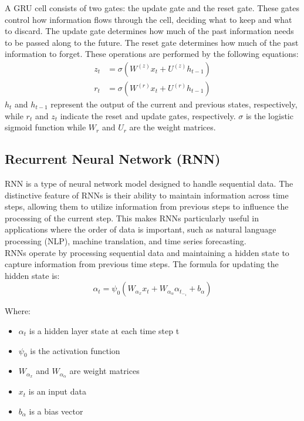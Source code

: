\documentclass{ieeeojies}
\begin{document}
A GRU cell consists of two gates: the update gate and the reset gate. These gates control how information flows through the cell, deciding what to keep and what to discard. The update gate determines how much of the past information needs to be passed along to the future. The reset gate determines how much of the past information to forget. These operations are performed by the following equations:
\begin{align*}
z_t &= \sigma\left( W^{(z)} x_t + U^{(z)} h_{t-1} \right) \\
r_t &= \sigma\left( W^{(r)} x_t + U^{(r)} h_{t-1} \right)
\end{align*}
\(h_t\) and \(h_{t-1}\) represent the output of the current and previous states, respectively, while \(r_t\) and \(z_t\) indicate the reset and update gates, respectively. \(\sigma\) is the logistic sigmoid function while \(W_r\) and \(U_r\) are the weight matrices.


\subsection{Recurrent Neural Network (RNN)}
RNN is a type of neural network model designed to handle sequential data. The distinctive feature of RNNs is their ability to maintain information across time steps, allowing them to utilize information from previous steps to influence the processing of the current step. This makes RNNs particularly useful in applications where the order of data is important, such as natural language processing (NLP), machine translation, and time series forecasting. \\
RNNs operate by processing sequential data and maintaining a hidden state to capture information from previous time steps. The formula for updating the hidden state is:
\[ \alpha_t=\psi_0(W_\alpha_xx_t + W_\alpha_\alpha\alpha_t_-_1 + b_\alpha) \]

Where:\\
    \begin{itemize}
        \item $\alpha_t$ is a hidden layer state at each time step t
        \item $\psi_0$ is the activation function
        \item $W_\alpha_x$ and $W_\alpha_\alpha$ are weight matrices
        \item $x_t$ is an input data
        \item $b_\alpha$ is a bias vector
    \end{itemize}\\
\end{document}
